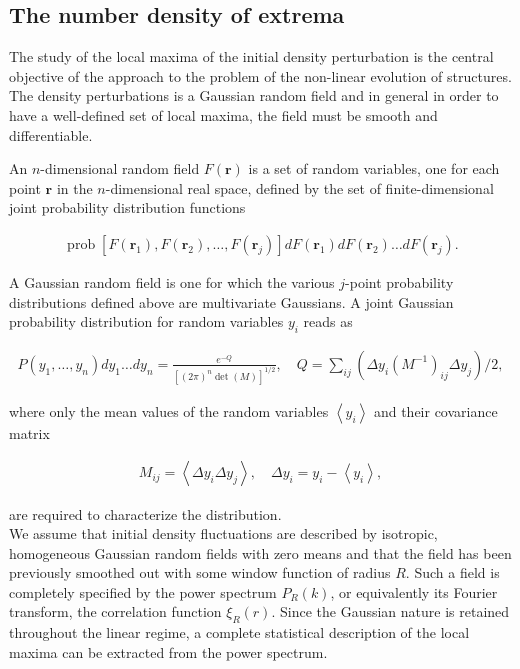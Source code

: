 \begin{appendices}
\section{The number density of extrema}
The study of the local maxima of the initial density perturbation is the central objective of the approach to the problem of the non-linear evolution of structures. The density perturbations is a Gaussian random field and in general in order to have a well-defined set of local maxima, the field must be smooth and differentiable.

An $n$-dimensional random field $F(\mathbf{r})$ is a set of random variables, one for each point $\mathbf{r}$ in the $n$-dimensional real space, defined by the set of finite-dimensional joint probability distribution functions

\begin{align}
    \operatorname{prob}\left[F\left(\mathbf{r}_{1}\right), F\left(\mathbf{r}_{2}\right), \ldots, F\left(\mathbf{r}_{j}\right)\right] d F\left(\mathbf{r}_{1}\right) d F\left(\mathbf{r}_{2}\right) \ldots d F\left(\mathbf{r}_{j}\right) .\label{d1} 
\end{align}

A Gaussian random field is one for which the various $j$-point probability distributions defined above are multivariate Gaussians. A joint Gaussian probability distribution for random variables $y_{i}$ reads as

\begin{align}
    P\left(y_{1}, \ldots, y_{n}\right) d y_{1} \ldots d y_{n}=\frac{e^{-Q}}{\left[(2 \pi)^{n} \operatorname{det}(M)\right]^{1 / 2}}, \quad Q=\sum_{i j}\left(\Delta y_{i}\left(M^{-1}\right)_{i j} \Delta y_{j}\right) / 2, \label{d2}
\end{align}

where only the mean values of the random variables $\left\langle y_{i}\right\rangle$ and their covariance matrix

\begin{align}
    M_{i j}=\left\langle\Delta y_{i} \Delta y_{j}\right\rangle, \quad \Delta y_{i}=y_{i}-\left\langle y_{i}\right\rangle, \label{d3}
\end{align}

are required to characterize the distribution.\\

We assume that initial density fluctuations are described by isotropic, homogeneous Gaussian random fields with zero means and that the field has been previously smoothed out with some window function of radius $R$. Such a field is completely specified by the power spectrum $P_{R}(k)$, or equivalently its Fourier transform, the correlation function $\xi_{R}(r)$. Since the Gaussian nature is retained throughout the linear regime, a complete statistical description of the local maxima can be extracted from the power spectrum.


\end{appendices}
